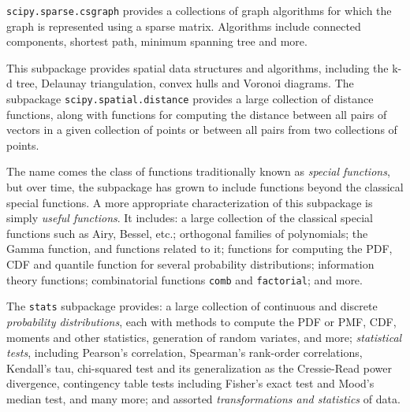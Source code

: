 \begin{description}[leftmargin=!, labelwidth=\widthof{\bfseries \texttt{interpolate}}]
    \texttt{scipy.sparse.csgraph} provides a collections of graph algorithms
    for which the graph is represented using a sparse matrix.  Algorithms
    include connected components, shortest path, minimum spanning tree
    and more.
\item[\texttt{spatial}]
    This subpackage provides spatial data structures and algorithms,
    including the k-d tree, Delaunay triangulation, convex hulls and Voronoi
    diagrams.  The subpackage \texttt{scipy.spatial.distance} provides
    a large collection of distance functions, along with functions for
    computing the distance between all pairs of vectors in a given collection
    of points or between all pairs from two collections of points.
\item[\texttt{special}]
    The name comes the class of functions traditionally known as \emph{special
    functions}, but over time, the subpackage has grown to include functions
    beyond the classical special functions.  A more appropriate characterization
    of this subpackage is simply \emph{useful functions}.
    It includes: a large collection of the classical special functions
    such as Airy, Bessel, etc.; orthogonal families of polynomials;
    the Gamma function, and functions related to it;
    functions for computing the PDF, CDF and quantile function for several
    probability distributions;
    information theory functions;
    combinatorial functions \texttt{comb} and \texttt{factorial};
    and more.
\item[\texttt{stats}]
    The \texttt{stats} subpackage provides: a large collection of continuous
    and discrete \emph{probability distributions}, each with methods to compute
    the PDF or PMF, CDF, moments and other statistics, generation of random
    variates, and more;
    \emph{statistical tests}, including Pearson's correlation, Spearman's rank-order
    correlations, Kendall's tau, chi-squared test and its generalization as the
    Cressie-Read power divergence, contingency table tests including Fisher's
    exact test and Mood's median test, and many more;
    and assorted \emph{transformations and statistics} of data.
\end{description}

